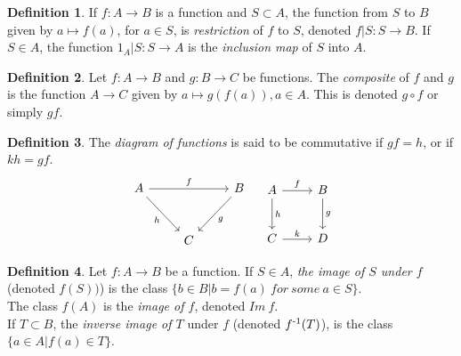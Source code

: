 \documentclass[a4paper,sfsidenotes,openany]{tufte-book}
\theoremstyle{definition}
\newtheorem{definition}{Definition}[section]
\begin{document}
\begin{fullwidth}
\begin{definition}
If $ f: A \rightarrow B $ is a function and $ S \subset A$, the function from $ S $ to $ B $ given by $ a \mapsto f(a) $, for $ a \in S $, is \textit{{\color{blue} restriction}} of $ f $ to $ S $, denoted $ f|S: S \rightarrow B$.\newline
If $ S \in A$, the function $ 1_A | S: S \rightarrow A $ is the \textit{{\color{blue} inclusion map}} of $S$ into $A$.\\
\end{definition}
\>

\begin{definition}
Let $ f: A \rightarrow B $ and $ g: B \rightarrow C $ be functions. The \textit{{\color{blue} composite}} of $ f $ and $ g $ is the function $ A \rightarrow C $ given by $ a \mapsto g(f(a)), a \in A $. This is denoted $ g \circ f $ or simply $ gf $.\\
\end{definition}
\>

\begin{definition}
The \textit{{\color{blue} diagram of functions}} is said to be commutative if $ gf = h $, or if $ kh = gf $.\\

\begin{equation}\label{diagram}
\begin{tikzcd}
A \arrow{rr}{f} \arrow[swap]{dr}{h} & & B \arrow{dl}{g} \\[10pt]
    & C
\end{tikzcd}
\quad
\begin{tikzcd}[row sep=2.5em]
 A \ar{r}{f} \ar{d}{h} & B \ar{d}{g} \\
 C \ar{r}{k} & D
\end{tikzcd}
\end{equation}
\end{definition}
\>

\begin{definition}
Let $ f: A \rightarrow B $ be a function. If $ S \in A $, \textit{{\color{blue} the image of $ S $ under $ f $}} (denoted $ f(S)) $) is the class $ \{ b \in B | b=f(a) \ for \ some \ a \in S\} $.\\
The class $ f(A) $ is the \textit{{\color{blue} image of $ f $}}, denoted $ Im \ f $.\\
If $ T \subset B $, the \textit{{\color{blue} inverse image of $ T $}} under $ f $ (denoted $ f \textsuperscript{-1} (T) $), is the class $ \{ a \in A | f(a) \in T\} $.\\
\end{definition}
\>


\end{fullwidth}
\end{document}
